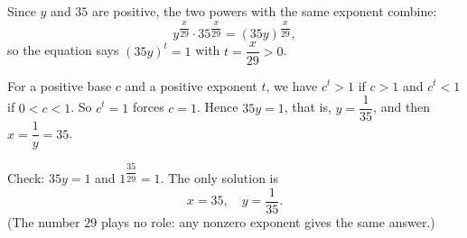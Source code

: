 Since $y$ and $35$ are positive, the two powers with the same exponent combine:
\[y^{\dfrac{x}{29}}\cdot35^{\dfrac{x}{29}}=(35y)^{\dfrac{x}{29}},\]
so the equation says $(35y)^{t}=1$ with $t=\dfrac{x}{29}>0$.

For a positive base $c$ and a positive exponent $t$, we have $c^t>1$ if $c>1$ and $c^t<1$ if $0<c<1$. So $c^t=1$ forces $c=1$. Hence $35y=1$, that is, $y=\dfrac{1}{35}$, and then $x=\dfrac{1}{y}=35$.

Check: $35y=1$ and $1^{\dfrac{35}{29}}=1$. The only solution is
\[\boxed{x=35,\quad y=\dfrac{1}{35}}.\]
(The number $29$ plays no role: any nonzero exponent gives the same answer.)
